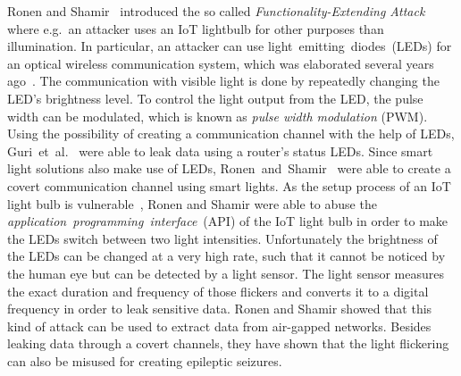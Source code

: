 Ronen and Shamir~\cite{Ronen:2016:EFAIDCSL} introduced the so called \textit{Functionality-Extending Attack} where e.g.\ an attacker uses an IoT lightbulb for other purposes than illumination.
In particular, an attacker can use light~emitting~diodes~(LEDs) for an optical wireless communication system, which was elaborated several years ago~\cite{Komine:2004:FAfVLCSuLL, Elgala:2007:OVLWCBoWL}. 
The communication with visible light is done by repeatedly changing the LED's brightness level. To control the light output from the LED, the pulse width can be modulated, which is known as \textit{pulse width modulation} (PWM).  
Using the possibility of creating a communication channel with the help of LEDs, Guri~et~al.~\cite{Guri:2017:xCDEANvRL} were able to leak data using a router's status LEDs.
Since smart light solutions also make use of LEDs, Ronen~and~Shamir~\cite{Ronen:2016:EFAIDCSL} were able to create a covert communication channel using smart lights.
As the setup process of an IoT light bulb is vulnerable~\cite{Dhanjani:2013:HLSEPHPWLS, Morgner:2016:AYBBUICSSCLS, Ronen:2018:IGNCZCR}, Ronen and Shamir were able to abuse the \textit{application~programming~interface}~(API) of the IoT light bulb in order to make the LEDs switch between two light intensities. Unfortunately the brightness of the LEDs can be changed at a very high rate, such that it cannot be noticed by the human eye but can be detected by a light sensor. 
The light sensor measures the exact duration and frequency of those flickers and converts it to a digital frequency in order to leak sensitive data.
Ronen and Shamir showed that this kind of attack can be used to extract data from air-gapped networks.
Besides leaking data through a covert channels, they have shown that the light flickering can also be misused for creating epileptic seizures.